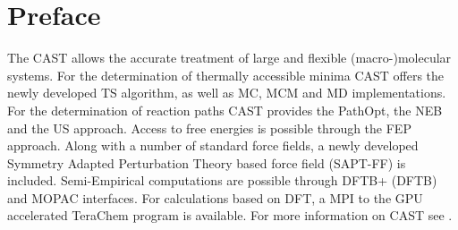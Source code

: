 \documentclass[10pt,a4paper]{article} %
\newif\ifdevelopment %
\begin{document}
	\section{Preface}
	The \ac{CAST} allows the accurate treatment of large and flexible (macro-)molecular systems. For the determination of thermally accessible minima \ac{CAST} offers the newly developed \ac{TS} algorithm\supercite{tabusearch}, as well as \ac{MC}\supercite{mc_original}, \ac{MCM}\supercite{MCM_original} and \acf{MD}\supercite{computer_simulation_of_MD} implementations. For the determination of reaction paths \ac{CAST} provides the PathOpt\supercite{pathopt}, the \ac{NEB}\supercite{neb_original} and the \ac{US}\supercite{umbrella_sampling} approach. Access to free energies is possible through the \ac{FEP} approach. Along with a number of standard force fields, a newly developed Symmetry Adapted Perturbation Theory based force field (\acs{SAPT-FF}) is included. Semi-Empirical computations are possible through DFTB+\supercite{dftb} (\acl{DFTB}) and \ac{MOPAC}\supercite{mopac, mopac_parallel} interfaces. For calculations based on \ac{DFT}, a \ac{MPI} to the \acs{GPU} accelerated TeraChem\supercite{terachem} program is available. For more information on \ac{CAST} see \cite{cast}.
	\newpage


	\ifdevelopment
	\section{Compiling CAST}
	The \ac{CAST} source code is not openly distributed. Currently, \ac{CAST} in principle has no external dependencies. The \ac{PME} code however at this point still depends on FFTW libraries and is therefore not enabled by default. If you need to perform simulations with \ac{PME}, please contact the \ac{CAST} developers. Compilation was verified using Microsoft Visual Studio 2015 Update 1 on Windows 10 and \acs{GCC} 5.3 on SuseLinux. A makefile for Linux operating systems is part of the source code repository.
	
	The source code is currently kept on a private GitHub repository. If you feel that you are entitled to access to the repository, please contact the \ac{CAST} developers and get an invitation.
	\fi
	\newpage
\end{document}
